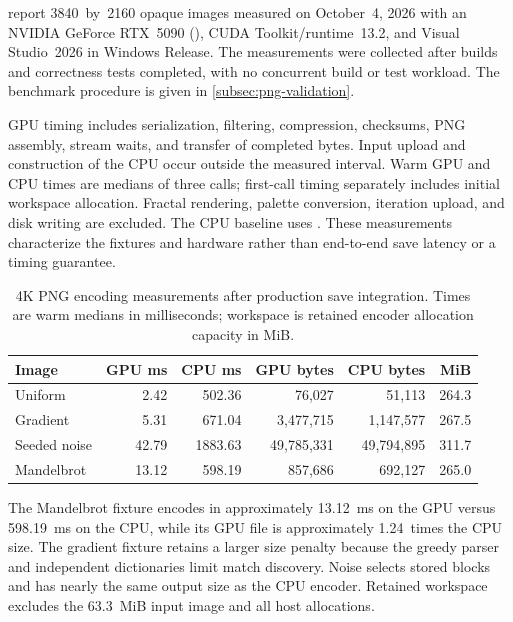  report
3840~by~2160 opaque images measured on October~4, 2026 with an NVIDIA
GeForce RTX~5090 (), CUDA Toolkit/runtime~13.2, and
Visual Studio~2026 in Windows Release. The measurements were collected
after builds and correctness tests completed, with no concurrent build
or test workload. The benchmark procedure is given in
\cref{subsec:png-validation}.

GPU timing includes serialization, filtering, compression, checksums,
PNG assembly, stream waits, and transfer of completed bytes. Input
upload and construction of the CPU  occur outside the
measured interval. Warm GPU and CPU times are medians of three calls;
first-call timing separately includes initial workspace allocation.
Fractal rendering, palette conversion, iteration upload, and disk
writing are excluded. The CPU baseline uses
. These measurements
characterize the fixtures and hardware rather than end-to-end save
latency or a timing guarantee.

\begin{table}[!htbp]
\centering
\small
\setlength{\tabcolsep}{4pt}
\caption[4K PNG encoding measurements]{4K PNG encoding measurements
after production save integration. Times are warm medians in
milliseconds; workspace is retained encoder allocation capacity in MiB.}
\label{tab:png-current-benchmark}
\begin{tabularx}{\textwidth}{Xrrrrr}
\hline
Image & GPU ms & CPU ms & GPU bytes & CPU bytes & MiB \\
\hline
Uniform      & 2.42  & 502.36  & 76,027     & 51,113     & 264.3 \\
Gradient     & 5.31  & 671.04  & 3,477,715  & 1,147,577  & 267.5 \\
Seeded noise & 42.79 & 1883.63 & 49,785,331 & 49,794,895 & 311.7 \\
Mandelbrot   & 13.12 & 598.19  & 857,686    & 692,127    & 265.0 \\
\hline
\end{tabularx}
\end{table}

The Mandelbrot fixture encodes in approximately 13.12~ms on the GPU
versus 598.19~ms on the CPU, while its GPU file is approximately
1.24~times the CPU size. The gradient fixture retains a larger size
penalty because the greedy parser and independent dictionaries limit
match discovery. Noise selects stored blocks and has nearly the same
output size as the CPU encoder. Retained workspace excludes the
63.3~MiB input image and all host allocations.

